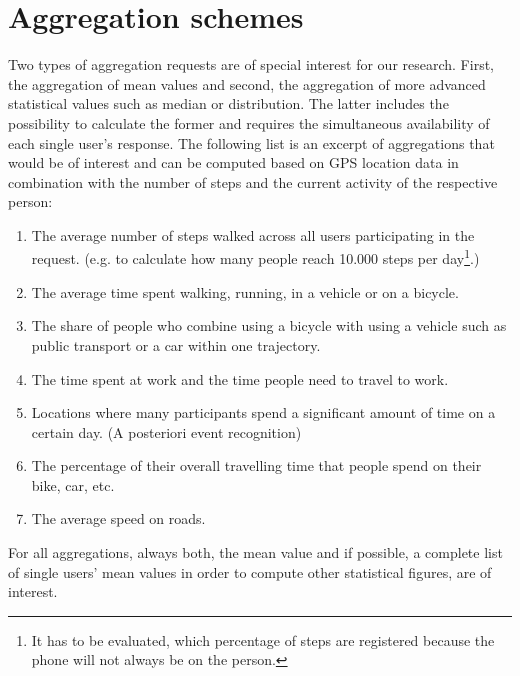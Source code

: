  \section{Aggregation schemes}\label{aggregation-schemes}
 Two types of aggregation requests are of special interest for our research. First, the aggregation of mean values and second, the aggregation of more advanced statistical values such as median or distribution. The latter includes the possibility to calculate the former and requires the simultaneous availability of each single user's response. %
 The following list is an excerpt of aggregations that would be of interest and can be computed based on GPS location data in combination with the number of steps and the current activity of the respective person:
 \begin{enumerate}
 	\item The average number of steps walked across all users participating in the request. (e.g. to calculate how many people reach 10.000 steps per day\footnote{It has to be evaluated, which percentage of steps are registered because the phone will not always be on the person.}.)
	\item The average time spent walking, running, in a vehicle or on a bicycle.
	\item The share of people who combine using a bicycle with using a vehicle such as public transport or a car within one trajectory.
	\item The time spent at work and the time people need to travel to work.
	\item Locations where many participants spend a significant amount of time on a certain day. (A posteriori event recognition)
	\item The percentage of their overall travelling time that people spend on their bike, car, etc.
	\item The average speed on roads.


 \end{enumerate}
 For all aggregations, always both, the mean value and if possible, a complete list of single users' mean values in order to compute other statistical figures, are of interest.

